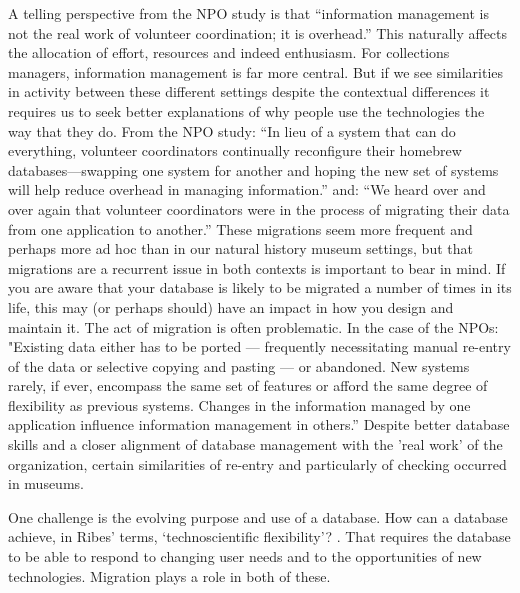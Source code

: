 A telling perspective from the NPO study is that “information management is not the real work of volunteer coordination; it is overhead.” This naturally affects the allocation of effort, resources and indeed enthusiasm. For collections managers, information management is far more central. But if we see similarities in activity between these different settings despite the contextual differences it requires us to seek better explanations of why people use the technologies the way that they do. From the NPO study: “In lieu of a system that can do everything, volunteer coordinators continually reconfigure their homebrew databases—swapping one system for another and hoping the new set of systems will help reduce overhead in managing information.”  and: “We heard over and over again that volunteer coordinators were in the process of migrating their data from one application to another.” These migrations seem more frequent and perhaps more ad hoc than in our natural history museum settings, but that migrations are a recurrent issue in both contexts is important to bear in mind. If you are aware that your database is likely to be migrated a number of times in its life, this may (or perhaps should) have an impact in how you design and maintain it. The act of migration is often problematic. In the case of the NPOs: "Existing data either has to be ported — frequently necessitating manual re-entry of the data or selective copying and pasting — or abandoned. New systems rarely, if ever, encompass the same set of features or afford the same degree of flexibility as previous systems. Changes in the information managed by one application influence information management in others.” Despite better database skills and a closer alignment of database management with the 'real work' of the organization, certain similarities of re-entry and particularly of checking occurred in museums.

One challenge is the evolving purpose and use of a database. How can a database achieve, in Ribes’ terms, ‘technoscientific flexibility’? \cite{ribes2014kernel} . That requires the database to be able to respond to changing user needs and to the opportunities of new technologies. Migration plays a role in both of these.

